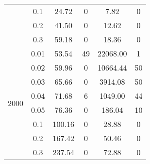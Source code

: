 \begin{tabular}{| c | c | c | c | c | c | }
	\cline{2-6}
	& 0.1 & 24.72 & 0 & 7.82 & 0\\
	\cline{2-6}
	& 0.2 & 41.50 & 0 & 12.62 & 0\\
	\cline{2-6}
	& 0.3 & 59.18 & 0 & 18.36 & 0\\
	\hline
	\multirow{8}{*}{2000} & 0.01 & 53.54 & 49 & 22068.00 & 1\\
	\cline{2-6}
	& 0.02 & 59.96 & 0 & 10664.44 & 50\\
	\cline{2-6}
	& 0.03 & 65.66 & 0 & 3914.08 & 50\\
	\cline{2-6}
	& 0.04 & 71.68 & 6 & 1049.00 & 44\\
	\cline{2-6}
	& 0.05 & 76.36 & 0 & 186.04 & 10\\
	\cline{2-6}
	& 0.1 & 100.16 & 0 & 28.88 & 0\\
	\cline{2-6}
	& 0.2 & 167.42 & 0 & 50.46 & 0\\
	\cline{2-6}
	& 0.3 & 237.54 & 0 & 72.88 & 0\\
	\hline
\end{tabular}